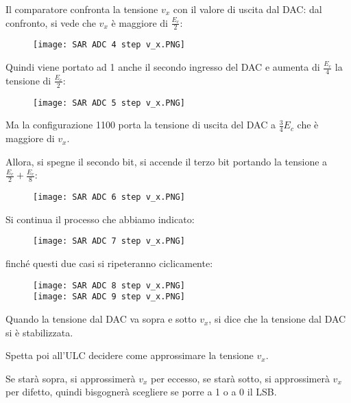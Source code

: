Il comparatore confronta la tensione $v_x$ con il valore di uscita dal DAC: 
dal confronto, si vede che $v_x$ è maggiore di $\frac{E_c}{2}$: 

\begin{figure}[h]
    \centering
    \texttt{[image: SAR ADC 4 step v\_x.PNG]}
\end{figure}

Quindi viene portato ad 1 anche il secondo ingresso del DAC e aumenta di $\frac{E_c}{4}$ la tensione di $\frac{E_c}{2}$: 

\begin{figure}[h]
    \centering
    \texttt{[image: SAR ADC 5 step v\_x.PNG]}
\end{figure}

Ma la configurazione 1100 porta la tensione di uscita del DAC a $\frac{3}{4} E_c$ che è maggiore di $v_x$. \newline 

Allora, si spegne il secondo bit, si accende il terzo bit portando la tensione a $\frac{E_c}{2} + \frac{E_c}{8}$: 

\begin{figure}[h]
    \centering
    \texttt{[image: SAR ADC 6 step v\_x.PNG]}
\end{figure}

\newpage 

Si continua il processo che abbiamo indicato: 

\begin{figure}[h]
    \centering
    \texttt{[image: SAR ADC 7 step v\_x.PNG]}
\end{figure}

finché questi due casi si ripeteranno ciclicamente: 

\begin{figure}[h]
    \centering
    \texttt{[image: SAR ADC 8 step v\_x.PNG]}
    \\ 
    \texttt{[image: SAR ADC 9 step v\_x.PNG]}
\end{figure}

\newpage 

Quando la tensione dal DAC va sopra e sotto $v_x$, si dice che la tensione dal DAC si è stabilizzata. \newline 

Spetta poi all'ULC decidere come approssimare la tensione $v_x$. \newline  

Se starà sopra, si approssimerà $v_x$ per eccesso, se starà sotto, si approssimerà $v_x$ per difetto, 
quindi bisgognerà scegliere se porre a 1 o a 0 il LSB. \newline 

